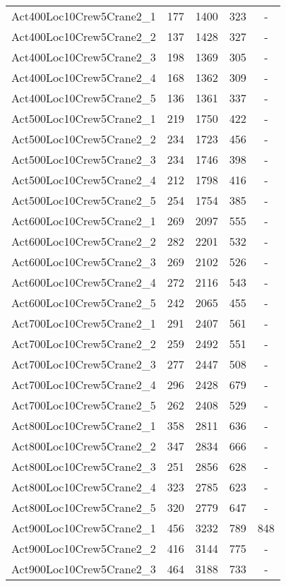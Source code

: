 \begin{center}
\begin{longtable}{ | l | c | c | c | c | }
Act400Loc10Crew5Crane2\_1	&	177	&	1400	&	323	&	-	\\	
Act400Loc10Crew5Crane2\_2	&	137	&	1428	&	327	&	-	\\	
Act400Loc10Crew5Crane2\_3	&	198	&	1369	&	305	&	-	\\	
Act400Loc10Crew5Crane2\_4	&	168	&	1362	&	309	&	-	\\	
Act400Loc10Crew5Crane2\_5	&	136	&	1361	&	337	&	-	\\		
Act500Loc10Crew5Crane2\_1	&	219	&	1750	&	422	&	-	\\	
Act500Loc10Crew5Crane2\_2	&	234	&	1723	&	456	&	-	\\	
Act500Loc10Crew5Crane2\_3	&	234	&	1746	&	398	&	-	\\	
Act500Loc10Crew5Crane2\_4	&	212	&	1798	&	416	&	-	\\	
Act500Loc10Crew5Crane2\_5	&	254	&	1754	&	385	&	-	\\	
Act600Loc10Crew5Crane2\_1	&	269	&	2097	&	555	&	-	\\	
Act600Loc10Crew5Crane2\_2	&	282	&	2201	&	532	&	-	\\	
Act600Loc10Crew5Crane2\_3	&	269	&	2102	&	526	&	-	\\	
Act600Loc10Crew5Crane2\_4	&	272	&	2116	&	543	&	-	\\	
Act600Loc10Crew5Crane2\_5	&	242	&	2065	&	455	&	-	\\	
Act700Loc10Crew5Crane2\_1	&	291	&	2407	&	561	&	-	\\	
Act700Loc10Crew5Crane2\_2	&	259	&	2492	&	551	&	-	\\	
Act700Loc10Crew5Crane2\_3	&	277	&	2447	&	508	&	-	\\	
Act700Loc10Crew5Crane2\_4	&	296	&	2428	&	679	&	-	\\	
Act700Loc10Crew5Crane2\_5	&	262	&	2408	&	529	&	-	\\	
Act800Loc10Crew5Crane2\_1	&	358	&	2811	&	636	&	-	\\	
Act800Loc10Crew5Crane2\_2	&	347	&	2834	&	666	&	-	\\	
Act800Loc10Crew5Crane2\_3	&	251	&	2856	&	628	&	-	\\	
Act800Loc10Crew5Crane2\_4	&	323	&	2785	&	623	&	-	\\	
Act800Loc10Crew5Crane2\_5	&	320	&	2779	&	647	&	-	\\	
Act900Loc10Crew5Crane2\_1	&	456	&	3232	&	789	&	848	\\	
Act900Loc10Crew5Crane2\_2	&	416	&	3144	&	775	&	-	\\	
Act900Loc10Crew5Crane2\_3	&	464	&	3188	&	733	&	-	\\	

\end{longtable}
\end{center}
